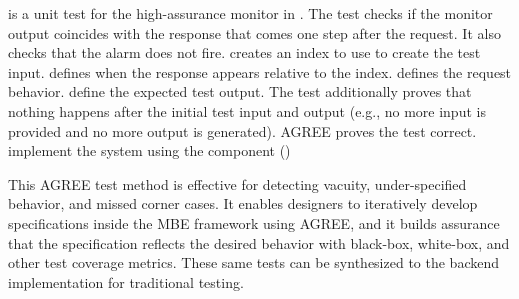  is a unit test for the high-assurance monitor in .
The test checks if the monitor output coincides with the response that comes one step after the request.
It also checks that the alarm does not fire.
 creates an index to use to create the test input.
 defines when the response appears relative to the index.
 defines the request behavior.
 define the expected test output.
The test additionally proves that nothing happens after the initial test input and output (e.g., no more input is provided and no more output is generated).
AGREE proves the test correct.
 implement the system using the component ()

This AGREE test method is effective for detecting vacuity, under-specified behavior, and missed corner cases.
It enables designers to iteratively develop specifications inside the MBE framework using AGREE, and it builds assurance that the specification reflects the desired behavior with black-box, white-box, and other test coverage metrics.
These same tests can be synthesized to the backend implementation for traditional testing.